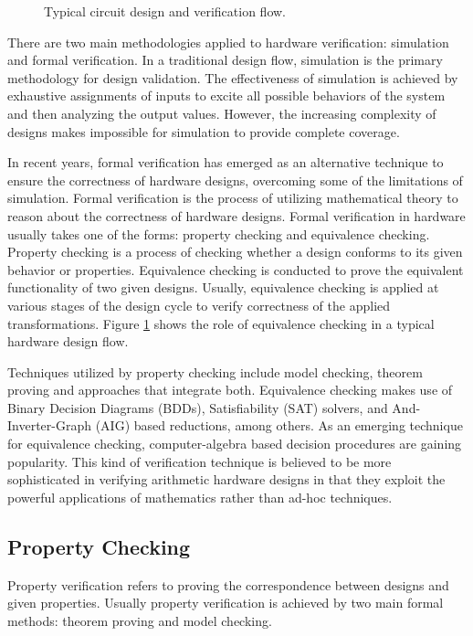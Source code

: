 {\epsfxsize=3.5in
\begin{figure}[t]
\centerline{
}
\caption{Typical circuit design and verification flow.}
\label{fig:cadflow}
\end{figure}
}

There are two main methodologies applied to hardware verification:
simulation and formal verification. In a traditional design flow,
simulation is the primary methodology for design validation.
The effectiveness of simulation is achieved by exhaustive assignments
of inputs to excite all possible behaviors of the system and then
analyzing the output values. However, the increasing complexity of
designs makes impossible for simulation to provide complete coverage. 

In recent years, formal verification has emerged as an alternative
technique to ensure the correctness of hardware designs, overcoming
some of the limitations of simulation. Formal verification is the
process of utilizing mathematical theory to reason about the
correctness of hardware designs. Formal verification in hardware
usually takes one of the forms: property checking and equivalence
checking. Property checking is a process of checking whether a design
conforms to its given behavior or properties. Equivalence checking is
conducted to prove the equivalent functionality of two given designs. 
Usually, equivalence checking is applied at various stages of the
design cycle to verify correctness of the applied
transformations. Figure \ref{fig:cadflow} shows the role of
equivalence checking in a typical hardware design flow. 

Techniques utilized by property checking include model checking,
theorem proving and approaches that integrate both.  Equivalence
checking makes use of Binary Decision Diagrams (BDDs), Satisfiability
(SAT) solvers, and And-Inverter-Graph (AIG) based reductions, among
others.  As an emerging technique for equivalence checking,
computer-algebra based decision procedures are gaining
popularity. This kind of verification technique is believed to be more
sophisticated in verifying arithmetic hardware designs in that they
exploit the powerful applications of mathematics rather than ad-hoc
techniques. 


\subsection{Property Checking}
Property verification refers to proving the correspondence between
designs and given properties. Usually property verification is
achieved by two main formal methods: theorem proving and model
checking.   


